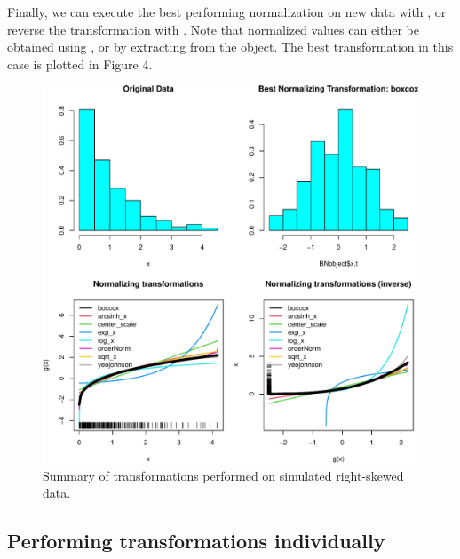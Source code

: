 Finally, we can execute the best performing normalization on new data
with , or reverse the
transformation with
.
Note that normalized values can either be obtained using ,
or by extracting  from the object. The best transformation in
this case is plotted in Figure 4.

\begin{Schunk}
\begin{figure}

{\centering \includegraphics[width=1\linewidth]{figs/hist_best-1} 

}

\caption[Summary of transformations performed on simulated right-skewed data]{Summary of transformations performed on simulated right-skewed data.}\label{fig:hist_best}
\end{figure}
\end{Schunk}

\hypertarget{performing-transformations-individually}{%
\subsection{Performing transformations
individually}\label{performing-transformations-individually}}


